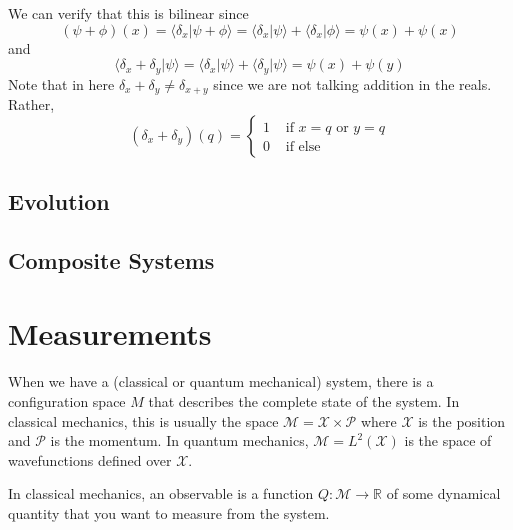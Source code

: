 \documentclass{article}
\newcommand{\braket}[2]{\langle #1 | #2 \rangle}
\begin{document}
      We can verify that this is bilinear since
      \begin{equation} 
        (\psi + \phi)(x) = \braket{\delta_x}{\psi + \phi} = \braket{\delta_x}{\psi} + \braket{\delta_x}{\phi} = \psi(x) + \psi(x)
      \end{equation}
      and 
      \begin{equation} 
        \braket{\delta_x + \delta_y}{\psi} = \braket{\delta_x}{\psi} + \braket{\delta_y}{\psi} = \psi(x) + \psi(y)
      \end{equation}
      Note that in here $\delta_x + \delta_y \neq \delta_{x + y}$ since we are not talking addition in the reals. Rather, 
      \begin{equation} 
        (\delta_x + \delta_y)(q) = \begin{cases} 1 & \text{ if } x = q \text{ or } y = q \\ 0 & \text{ if else} \end{cases}
      \end{equation}

    \subsection{Evolution} 


    \subsection{Composite Systems}


\section{Measurements}

  When we have a (classical or quantum mechanical) system, there is a configuration space $M$ that describes the complete state of the system. In classical mechanics, this is usually the space $\mathcal{M} = \mathcal{X} \times \mathcal{P}$ where $\mathcal{X}$ is the position and $\mathcal{P}$ is the momentum. In quantum mechanics, $\mathcal{M} = L^2(\mathcal{X})$ is the space of wavefunctions defined over $\mathcal{X}$. 

  \begin{definition}
    \label{def:observable-in-classical-mechanics}
    In classical mechanics, an observable is a function $Q: \mathcal{M} \rightarrow \mathbb{R}$ of some dynamical quantity that you want to measure from the system.  
  \end{definition}
\end{document}

